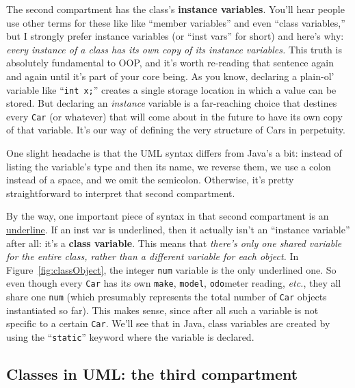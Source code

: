 The second compartment has the class's \textbf{instance variables}. You'll hear
people use other terms for these like like ``member variables'' and even
``class variables,'' but I strongly prefer instance variables (or ``inst vars''
for short) and here's why: \textit{every instance of a class has its own copy
of its instance variables.} This truth is absolutely fundamental to OOP, and
it's worth re-reading that sentence again and again until it's part of your
core being. As you know, declaring a plain-ol' variable like ``\texttt{int
x;}'' creates a single storage location in which a value can be stored. But
declaring an \textit{instance} variable is a far-reaching choice that destines
every \texttt{Car} (or whatever) that will come about in the future to have its
own copy of that variable. It's our way of defining the very structure of Cars
in perpetuity.

One slight headache is that the UML syntax differs from Java's a bit: instead
of listing the variable's type and then its name, we reverse them, we use
a colon instead of a space, and we omit the semicolon. Otherwise, it's pretty
straightforward to interpret that second compartment.

\label{mentionStatic}
By the way, one important piece of syntax in that second compartment is an
\underline{underline}. If an inst var is underlined, then it actually isn't an
``instance variable'' after all: it's a \textbf{class variable}. This means
that \textit{there's only one shared variable for the entire class, rather
than a different variable for each object.} In Figure~\ref{fig:classObject},
the integer \texttt{num} variable is the only underlined one. So even though
every \texttt{Car} has its own \texttt{make}, \texttt{model},
\texttt{odo}meter reading, \textit{etc.}, they all share one \texttt{num}
(which presumably represents the total number of \texttt{Car} objects
instantiated so far). This makes sense, since after all such a variable is not
specific to a certain \texttt{Car}. We'll see that in Java, class variables
are created by using the ``\texttt{static}'' keyword where the variable is
declared.

\subsection{Classes in UML: the third compartment}

